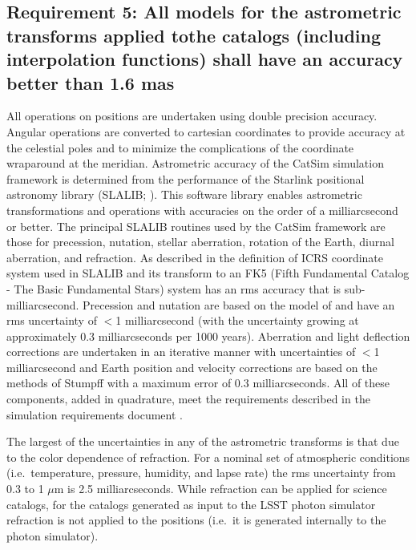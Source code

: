 \documentclass[]{article}
\begin{document}
\subsection{Requirement 5: All models for the astrometric transforms applied tothe catalogs (including interpolation functions) 
shall have an accuracy better than 1.6 mas}
All operations on positions are undertaken using double precision accuracy. Angular operations are converted to cartesian coordinates to provide accuracy at the celestial poles and to minimize the complications of the coordinate wraparound at the meridian. Astrometric accuracy of the CatSim simulation framework is determined from the performance of the Starlink positional astronomy library (SLALIB; \cite{wallace}). This software library enables astrometric transformations and operations with
accuracies on the order of a milliarcsecond or better.  The principal SLALIB routines used by the CatSim framework are those for precession, nutation, stellar aberration, rotation of the Earth, diurnal aberration, and refraction.  As described in \cite{wallace} the definition of ICRS coordinate system used in SLALIB and its transform to an FK5 (Fifth Fundamental Catalog - The Basic Fundamental Stars) system has an rms accuracy that is sub-milliarcsecond. Precession and nutation are based on the
model of \cite{SF2001} and have an rms uncertainty of $<$1 milliarcsecond (with the uncertainty growing at approximately 0.3 milliarcseconds per 1000 years). Aberration and light deflection corrections are undertaken in an iterative manner with uncertainties of $<$1 milliarcsecond and Earth position and velocity corrections are based on the methods of Stumpff \citep{stumpff} with a maximum error of 0.3 milliarcseconds. All of these components, added in quadrature, meet the requirements described
in the simulation requirements document \cite{connolly}.

The largest of the uncertainties in any of the astrometric transforms is that due to the color dependence of refraction. For a nominal set of atmospheric conditions (i.e.\ temperature, pressure, humidity, and lapse rate) the rms uncertainty from 0.3 to 1 $\mu$m is 2.5 milliarcseconds. While refraction can be applied for science catalogs, for the catalogs generated as input to the LSST photon simulator refraction is not applied to the positions (i.e.\ it is generated internally to the photon
simulator).
\end{document}
